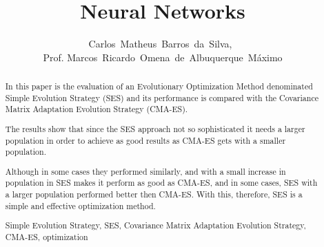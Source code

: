 \documentclass[journal]{IEEEtran}
\begin{document}
    \title{Neural Networks}
  \author{Carlos~Matheus~Barros~da~Silva,~\\Prof. Marcos~Ricardo~Omena~de~Albuquerque~Máximo}


\maketitle



\begin{abstract}

In this paper is the evaluation of an Evolutionary Optimization Method denominated Simple Evolution Strategy (SES) and its performance is compared with the Covariance Matrix Adaptation Evolution Strategy (CMA-ES).

The results show that since the SES approach not so sophisticated it needs a larger population in order to achieve as good results as CMA-ES gets with a smaller population.

Although in some cases they performed similarly, and with a small increase in population in SES makes it perform as good as CMA-ES, and in some cases, SES with a larger population performed better then CMA-ES. With this, therefore, SES is a simple and effective optimization method.

\begin{IEEEkeywords}
    Simple Evolution Strategy, SES, Covariance Matrix Adaptation Evolution Strategy, CMA-ES, optimization
\end{IEEEkeywords}
\end{abstract}

\IEEEpeerreviewmaketitle

\end{document}
